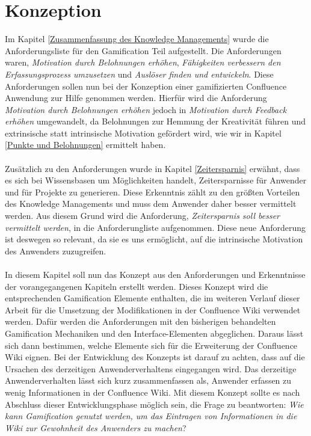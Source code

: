 \documentclass[a4paper,12pt,twoside]{scrartcl}
\begin{document}
\section{Konzeption}
\label{Konzeption}
Im Kapitel \ref{Zusammenfassung des Knowledge Managements} wurde die Anforderungsliste für den Gamification Teil aufgestellt. Die Anforderungen waren, \textit{Motivation durch Belohnungen erhöhen}, \textit{Fähigkeiten verbessern den Erfassungsprozess umzusetzen} und \textit{Auslöser finden und entwickeln}. Diese Anforderungen sollen nun bei der Konzeption einer gamifizierten Confluence Anwendung zur Hilfe genommen werden. Hierfür wird die Anforderung \textit{Motivation durch Belohnungen erhöhen} jedoch in \textit{Motivation durch Feedback erhöhen} umgewandelt, da Belohnungen zur Hemmung der Kreativität führen und extrinsische statt intrinsische Motivation gefördert wird, wie wir in Kapitel \ref{Punkte und Belohnungen} ermittelt haben.
\\\\
Zusätzlich zu den Anforderungen wurde in Kapitel \ref{Zeitersparnis} erwähnt, dass es sich bei Wissensbasen um Möglichkeiten handelt, Zeitersparnisse für Anwender und für Projekte zu generieren. Diese Erkenntnis zählt zu den größten Vorteilen des Knowledge Managements und muss dem Anwender daher besser vermittelt werden. Aus diesem Grund wird die Anforderung, \textit{Zeitersparnis soll besser vermittelt werden}, in die Anforderungliste aufgenommen. Diese neue Anforderung ist deswegen so relevant, da sie es uns ermöglicht, auf die intrinsische Motivation des Anwenders zuzugreifen.
\\\\
In diesem Kapitel soll nun das Konzept aus den Anforderungen und Erkenntnisse der vorangegangenen Kapiteln erstellt werden. Dieses Konzept wird die entsprechenden Gamification Elemente enthalten, die im weiteren Verlauf dieser Arbeit für die Umsetzung der Modifikationen in der Confluence Wiki verwendet werden. Dafür werden die Anforderungen mit den bisherigen behandelten Gamification Mechaniken und den Interface-Elementen abgeglichen. Daraus lässt sich dann bestimmen, welche Elemente sich für die Erweiterung der Confluence Wiki eignen. Bei der Entwicklung des Konzepts ist darauf zu achten, dass auf die Ursachen des derzeitigen Anwenderverhaltens eingegangen wird. Das derzeitige Anwenderverhalten lässt sich kurz zusammenfassen als, Anwender erfassen zu wenig Informationen in der Confluence Wiki. Mit diesem Konzept sollte es nach Abschluss dieser Entwicklungsphase möglich sein, die Frage zu beantworten: \textit{Wie kann Gamification genutzt werden, um das Eintragen von Informationen in die Wiki zur Gewohnheit des Anwenders zu machen}?
\end{document}
